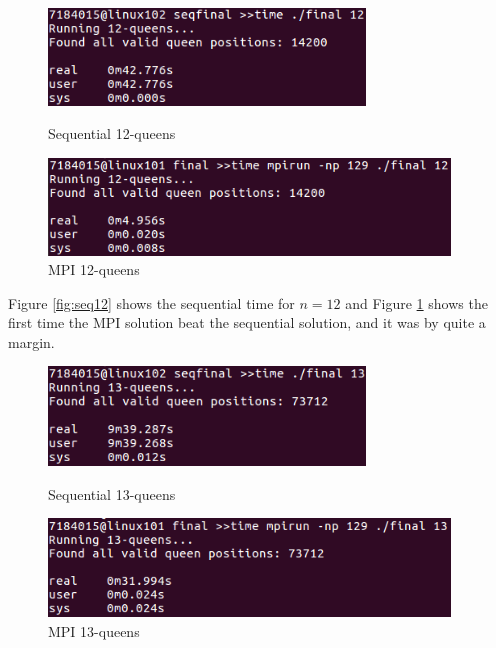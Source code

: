 \documentclass{article}
\begin{document}
\begin{figure}[h]
    \centering
    \begin{minipage}{0.49\textwidth}
        \centering
        \includegraphics[width=0.75\textwidth]{MPI_2_12}
        \caption{Sequential 12-queens}
        \label{fig:seq12}
    \end{minipage}\hfill
    \begin{minipage}{0.49\textwidth}
        \centering
        \includegraphics[width=0.95\textwidth]{MPI_12}
        \caption{MPI 12-queens}
        \label{fig:mpi12}
    \end{minipage}
\end{figure}

Figure \ref{fig:seq12} shows the sequential time for $n=12$ and Figure 
\ref{fig:mpi12} shows the first time the MPI solution beat the sequential 
solution, and it was by quite a margin.

\begin{figure}[h]
    \centering
    \begin{minipage}{0.49\textwidth}
        \centering
        \includegraphics[width=0.75\textwidth]{MPI_2_13}
        \caption{Sequential 13-queens}
        \label{fig:seq13}
    \end{minipage}\hfill
    \begin{minipage}{0.49\textwidth}
        \centering
        \includegraphics[width=0.95\textwidth]{MPI_13}
        \caption{MPI 13-queens}
        \label{fig:mpi13}
    \end{minipage}
\end{figure}
\end{document}
